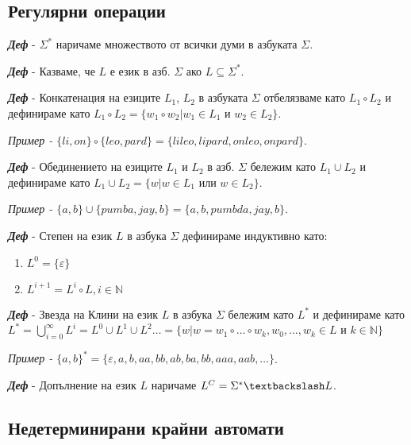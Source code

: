 \documentclass[fleqn,12pt]{article}
\begin{document}
\begin{flushleft}

\subsection{Регулярни операции}

\textit{\textbf{Деф}} - $\Sigma^*$ наричаме множеството от всички думи в азбуката $\Sigma$.

\textit{\textbf{Деф}} - Казваме, че $L$ е език в азб. $\Sigma$ ако $L \subseteq \Sigma^*$.

\textit{\textbf{Деф}} - Конкатенация на езиците $L_1$, $L_2$ в азбуката $\Sigma$ отбелязваме като $L_1 \circ L_2$ и дефинираме като $L_1 \circ L_2 = \{w_1 \circ w_2 | w_1 \in L_1 $ и $ w_2 \in L_2\}$.

\textit{Пример - $\{li, on\} \circ \{leo, pard\} = \{lileo, lipard, onleo, onpard\}$}.

\textit{\textbf{Деф}} - Обединението на езиците $L_1$ и $L_2$ в азб. $\Sigma$ бележим като $L_1 \cup L_2$ и дефинираме като $L_1 \cup L_2 = \{w | w \in L_1 $ или $ w \in L_2\}$.

\textit{Пример - $\{a, b\} \cup \{pumba, jay, b\} = \{a, b, pumbda, jay, b\}$}.

\textit{\textbf{Деф}} - Степен на език $L$ в азбука $\Sigma$ дефинираме индуктивно като:
\begin{enumerate}
    \item $L^0 = \{\varepsilon\}$
    \item $L^{i+1} = L^i \circ L, i \in \mathbb{N}$
\end{enumerate}

\textit{\textbf{Деф}} - Звезда на Клини на език $L$ в азбука $\Sigma$ бележим като $L^*$ и дефинираме като $L^* = \bigcup\limits_{i=0}^{\infty} L^{i} = L^0 \cup L^1 \cup L^2 \dots = \{w | w = w_1 \circ \dots \circ w_k, w_0, \dots, w_k \in L $ и $ k \in \mathbb{N}\}$

\textit{Пример - $\{a, b\}^* = \{\varepsilon, a, b, aa, bb, ab, ba, bb, aaa, aab, \dots\}$}.

\textit{\textbf{Деф}} - Допълнение на език $L$ наричаме $L^C = \Sigma^* \textbackslash L$.

\subsection{Недетерминирани крайни автомати}


\end{flushleft}
\end{document}
